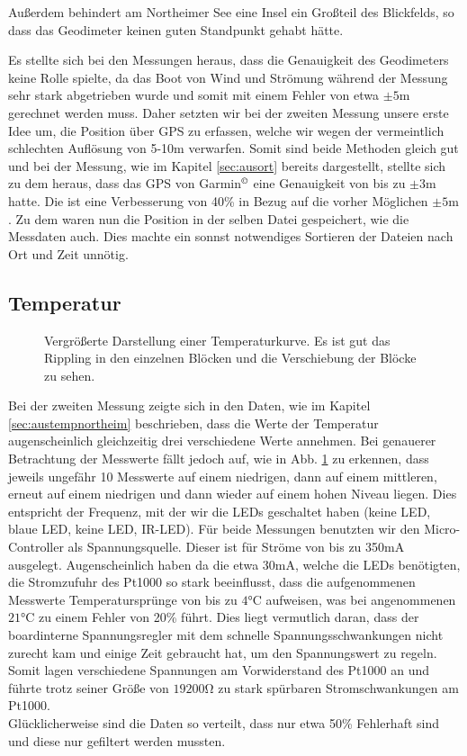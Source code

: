 \documentclass[12pt,a4paper,titlepage,headinclude,bibtotoc]{scrartcl}
\numberwithin{equation}{subsection}
\begin{document}
Außerdem behindert am Northeimer See eine Insel ein Großteil des Blickfelds, so dass das Geodimeter keinen guten Standpunkt gehabt hätte.

Es stellte sich bei den Messungen heraus, dass die Genauigkeit des Geodimeters keine Rolle spielte, da das Boot von Wind und Strömung während der Messung sehr stark abgetrieben wurde und somit mit einem Fehler von etwa $\pm5\si{\meter}$ gerechnet werden muss.
Daher setzten wir bei der zweiten Messung unsere erste Idee um, die Position über GPS zu erfassen, welche wir wegen der vermeintlich schlechten Auflösung von 5-10m verwarfen.
Somit sind beide Methoden gleich gut und bei der Messung, wie im Kapitel \ref{sec:ausort} bereits dargestellt, stellte sich zu dem heraus, dass das GPS von Garmin$^\copyright$ eine Genauigkeit von bis zu $\pm3\si{\meter}$ hatte.
Die ist eine Verbesserung von 40\% in Bezug auf die vorher Möglichen $\pm5\si{\meter}$.
Zu dem waren nun die Position in der selben Datei gespeichert, wie die Messdaten auch.
Dies machte ein sonnst notwendiges Sortieren der Dateien nach Ort und Zeit unnötig.

\subsection{Temperatur}
\label{sec:DiskTemp}
\begin{figure}[h]
	\centering
	
	\caption{Vergrößerte Darstellung einer Temperaturkurve. Es ist gut das Rippling in den einzelnen Blöcken und die Verschiebung der Blöcke zu sehen.}
	\label{fig:tempSprung}
\end{figure}
Bei der zweiten Messung zeigte sich in den Daten, wie im Kapitel \ref{sec:austempnortheim} beschrieben, dass die Werte der Temperatur augenscheinlich gleichzeitig drei verschiedene Werte annehmen.
Bei genauerer Betrachtung der Messwerte fällt jedoch auf, wie in Abb. \ref{fig:tempSprung} zu erkennen, dass jeweils ungefähr 10 Messwerte auf einem niedrigen, dann auf einem mittleren, erneut auf einem niedrigen und dann wieder auf einem hohen Niveau liegen.
Dies entspricht der Frequenz, mit der wir die LEDs geschaltet haben (keine LED, blaue LED, keine LED, IR-LED).
Für beide Messungen benutzten wir den Micro-Controller als Spannungsquelle.
Dieser ist für Ströme von bis zu 350mA ausgelegt.
Augenscheinlich haben da die etwa 30\si{\milli\ampere}, welche die LEDs benötigten, die Stromzufuhr des Pt1000 so stark beeinflusst, dass die aufgenommenen Messwerte Temperatursprünge von bis zu $4\si{\celsius}$ aufweisen, was bei angenommenen $21\si{\celsius}$ zu einem Fehler von 20\% führt.
Dies liegt vermutlich daran, dass der boardinterne Spannungsregler mit dem schnelle Spannungsschwankungen nicht zurecht kam und einige Zeit gebraucht hat, um den Spannungswert zu regeln.
Somit lagen verschiedene Spannungen am Vorwiderstand des Pt1000 an und führte trotz seiner Größe von $19200\si{\ohm}$ zu stark spürbaren Stromschwankungen am Pt1000.\\
Glücklicherweise sind die Daten so verteilt, dass nur etwa 50\% Fehlerhaft sind und diese nur gefiltert werden mussten.
\end{document}
